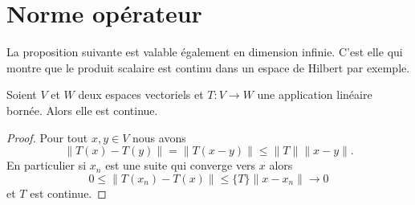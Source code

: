 \section{Norme opérateur}

La proposition suivante est valable également en dimension infinie. C'est elle qui montre que le produit scalaire est continu dans un espace de Hilbert par exemple.
\begin{proposition}     \label{PropmEJjLE}
    Soient \( V\) et \( W\) deux espaces vectoriels et \( T\colon V\to W\) une application linéaire bornée. Alors elle est continue.
\end{proposition}

\begin{proof}
    Pour tout \( x,y\in V\) nous avons
    \begin{equation}
        \| T(x)-T(y) \|=\| T(x-y) \|\leq \| T \|\| x-y \|.
    \end{equation}
    En particulier si \( x_n\) est une suite qui converge vers \( x\) alors
    \begin{equation}
        0\leq \| T(x_n)-T(x) \|\leq \{ T \}\| x-x_n \|\to 0
    \end{equation}
    et \( T\) est continue.
\end{proof}

